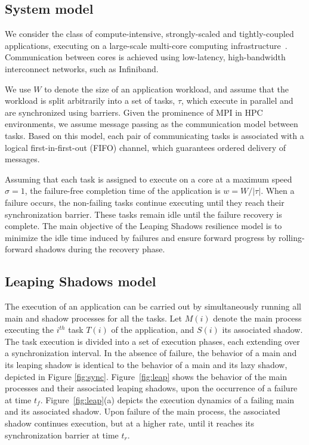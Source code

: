 \subsection {System model}

We consider the class of compute-intensive, strongly-scaled and tightly-coupled applications, executing on a large-scale multi-core computing infrastructure~\cite{doe_ascr_exascale_2011}. Communication between cores is achieved using low-latency, high-bandwidth interconnect networks, such as Infiniband. 

We use $W$ to denote the size of an application workload, and assume that the workload is split  arbitrarily into a set of tasks, $\tau$, which execute in parallel and are synchronized using barriers. Given the prominence of MPI in HPC environments, we assume message passing as the communication model between tasks. Based on this model, each pair of communicating tasks is associated with a logical first-in-first-out  (FIFO) channel, which guarantees ordered delivery of messages.

Assuming that each task is assigned to execute on a core at a maximum speed $\sigma=1$, the failure-free completion time of the application is $w = W/|\tau|$. When a failure occurs, the non-failing tasks continue executing until they reach their synchronization barrier. These tasks remain idle until the failure recovery is complete. The main objective of the Leaping Shadows resilience model is to minimize the idle time induced by failures and ensure forward progress by rolling-forward shadows during the recovery phase. 






\subsection {Leaping Shadows model}

The execution of an application can be carried out by simultaneously running all main and shadow processes for all the tasks. Let $M(i)$ denote the main process executing the $i^{th}$ task $T(i)$ of the application, and $S(i)$ its associated shadow. The task execution is divided into a set of execution phases, each extending over a synchronization interval. In the absence of failure, the behavior of a main  and its leaping shadow is identical to the behavior of a main and its lazy shadow, depicted in Figure \ref{fig:sync}. Figure~\ref{fig:leap} shows the behavior of the main processes and their associated leaping shadows, upon the occurrence of a failure at time $t_f$. Figure~\ref{fig:leap}(a) depicts the execution dynamics of a failing main and its associated shadow. Upon failure of the main process, the associated shadow continues execution, but at a higher rate, until it reaches its synchronization barrier at time $t_r$. 


